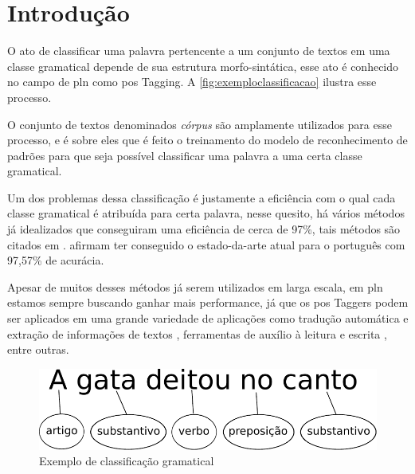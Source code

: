\chapter{Introdução}\label{introducao}

O ato de classificar uma palavra pertencente a um conjunto de textos em uma classe gramatical depende de sua estrutura morfo-sintática, esse ato é conhecido no campo de \ac{pln} como \ac{pos} Tagging. A \autoref{fig:exemploclassificacao} ilustra esse processo. 

O conjunto de textos denominados \textit{córpus} são amplamente utilizados para esse processo, e é sobre eles que é feito o treinamento do modelo de reconhecimento de padrões para que seja possível classificar uma palavra a uma certa classe gramatical.

Um dos problemas dessa classificação é justamente a eficiência com o qual cada classe gramatical é atribuída para certa palavra, nesse quesito, há vários métodos já idealizados que conseguiram uma eficiência de cerca de 97\%, tais métodos são citados em \cite{dos2014training, collobert2011deep, fonseca2015evaluating}.  afirmam ter conseguido o estado-da-arte atual para o português com 97,57\% de acurácia.

Apesar de muitos desses métodos já serem utilizados em larga escala, em \ac{pln} estamos sempre buscando ganhar mais performance, já que os \ac{pos} Taggers podem ser aplicados em uma grande variedade de aplicações como tradução automática e extração de informações de textos \cite{manning1999foundations}, ferramentas de auxílio à leitura e escrita \cite{marquiafavel2010processo}, entre outras.

\begin{figure}[htb]
  \caption{Exemplo de classificação gramatical}\label{fig:exemploclassificacao}
  \begin{center}
      \includegraphics[scale=0.5]{img/exemploclassificacao.pdf}
  \end{center}
\end{figure}

